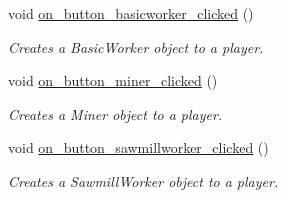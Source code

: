 \begin{DoxyCompactItemize}
void \hyperlink{classMapWindow_a9a9612a97362a01b82aa977b64ddce2e}{on\-\_\-button\-\_\-basicworker\-\_\-clicked} ()
\begin{DoxyCompactList}\small\item\em Creates a Basic\-Worker object to a player. \end{DoxyCompactList}\item 
void \hyperlink{classMapWindow_acecc87947d4ac9582f758d67a25b1480}{on\-\_\-button\-\_\-miner\-\_\-clicked} ()
\begin{DoxyCompactList}\small\item\em Creates a Miner object to a player. \end{DoxyCompactList}\item 
void \hyperlink{classMapWindow_af4d0221994ef257897afa50750657a8a}{on\-\_\-button\-\_\-sawmillworker\-\_\-clicked} ()
\begin{DoxyCompactList}\small\item\em Creates a Sawmill\-Worker object to a player. \end{DoxyCompactList}\end{DoxyCompactItemize}
